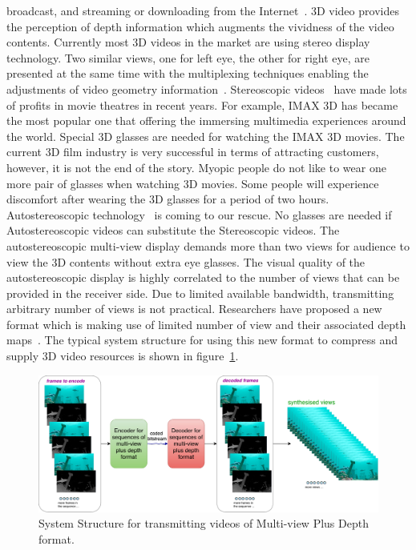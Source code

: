 broadcast, and streaming or downloading from the Internet~\parencite{RN118}.
3D video provides the perception of depth information which augments
the vividness of the video contents.
Currently most 3D videos in the market are using stereo display technology.
Two similar views, one for left eye, the other for right eye, are presented
at the same time with the multiplexing techniques enabling the
adjustments of video geometry information~\parencite{RN196}.
Stereoscopic videos~\parencite{RN153} have
made lots of profits in movie theatres in recent years.
For example, IMAX 3D has became the most popular one that offering
the immersing multimedia experiences around the world.
Special 3D glasses are needed for watching the IMAX 3D movies.
The current 3D film industry is very successful in terms of attracting
customers, however, it is not the end of the story.
Myopic people do not like to wear one more pair of glasses when
watching 3D movies.
Some people will experience discomfort after wearing the 3D glasses for a
period of two hours.
Autostereoscopic technology~\parencite{RN153} is coming to our rescue.
No glasses are needed if Autostereoscopic videos can
substitute the Stereoscopic videos.
The autostereoscopic multi-view display demands more than two
views for audience to view the 3D contents
without extra eye glasses.
The visual quality of
the autostereoscopic display is highly correlated to the number of views
that can be provided in the receiver side.
Due to limited available bandwidth, transmitting arbitrary number of views
is not practical.
Researchers have proposed a new format which is making use of limited number
of view and their associated depth maps~\parencite{RN44}.
The typical system structure for using this new format to compress and supply 3D video
resources is shown in figure~\ref{fig:SS-MVD}.
\begin{figure}
    \centering
    \includegraphics[width=\textwidth,height=\textheight,keepaspectratio]{Figures/SystemStructureOf3DEncoder}
    \caption[System Structure for transmitting videos of Multi-view Plus Depth format]{System Structure for transmitting videos of Multi-view Plus Depth format.}
    \label{fig:SS-MVD}
\end{figure}
